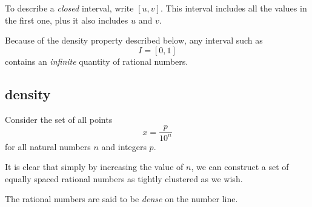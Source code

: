 \documentclass[11pt, oneside]{article}
\begin{document}
To describe a \emph{closed} interval, write $[u,v]$.  This interval includes all the values in the first one, plus it also includes $u$ and $v$.

Because of the density property described below, any interval such as
\[ I = [0,1] \]
contains an \emph{infinite} quantity of rational numbers.

\subsection*{density}
Consider the set of all points
\[ x = \frac{p}{10^n} \]
for all natural numbers $n$ and integers $p$.

It is clear that simply by increasing the value of $n$, we can construct a set of equally spaced rational numbers as tightly clustered as we wish.

The rational numbers are said to be \emph{dense} on the number line.  
\end{document}
